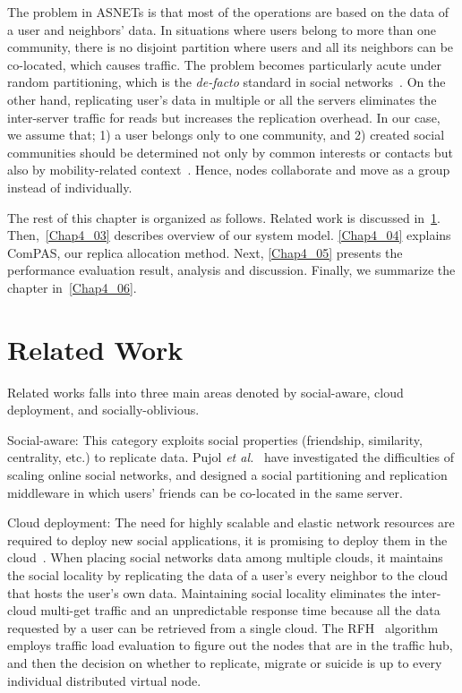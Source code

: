 The problem in ASNETs is that most of the operations are based on the data of a user and neighbors' data. In situations where users belong to more than one community, there is no disjoint partition where users and all its neighbors can be co-located, which causes traffic. The problem becomes particularly acute under random partitioning, which is the {\it de-facto} standard in social networks~\cite{Pujol2010}. On the other hand, replicating user's data in multiple or all the servers eliminates the inter-server traffic for reads but increases the replication overhead. In our case, we assume that; 1) a user belongs only to one community, and 2) created social communities should be determined not only by common interests or contacts but also by mobility-related context~\cite{PBellavista2013}. Hence, nodes collaborate and move as a group instead of individually.

The rest of this chapter is organized as follows. Related work is discussed in~\ref{Chap4_02}. Then,~\ref{Chap4_03} describes overview of our system model. \ref{Chap4_04} explains ComPAS, our replica allocation method. Next, \ref{Chap4_05} presents the performance evaluation result, analysis and discussion. Finally, we summarize the chapter in~\ref{Chap4_06}.

\section{Related Work}\label{Chap4_02}
Related works falls into three main areas denoted by social-aware, cloud deployment, and socially-oblivious.

Social-aware: This category exploits social properties (friendship, similarity, centrality, etc.) to replicate data. Pujol {\it et al.}~\cite{Pujol2010} have investigated the difficulties of scaling online social networks, and designed a social partitioning and replication middleware in which users' friends can be co-located in the same server.

Cloud deployment: The need for highly scalable and elastic network resources are required to deploy new social applications, it is promising to deploy them in the cloud~\cite{PStuedi2011}\cite{ZWang2012}. When placing social networks data among multiple clouds, it maintains the social locality by replicating the data of a user's every neighbor to the cloud that hosts the user's own data. Maintaining social locality eliminates the inter-cloud multi-get traffic and an unpredictable response time because all the data requested by a user can be retrieved from a single cloud. The RFH~\cite{YQu2012} algorithm employs traffic load evaluation to figure out the nodes that are in the traffic hub, and then the decision on whether to replicate, migrate or suicide is up to every individual distributed virtual node.

